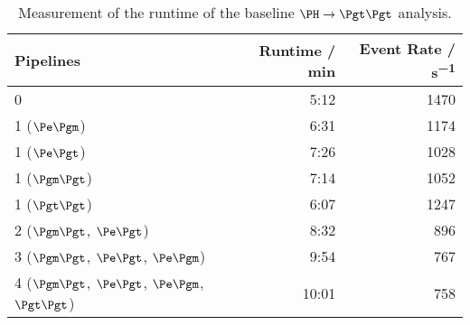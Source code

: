 \documentclass[3p]{elsarticle}
\begin{document}
\begin{table}[!ht]
\centering
\begin{tabular}{lrr}
\toprule
\textbf{Pipelines}                                & \textbf{Runtime / \si{min}} & \textbf{Event Rate / \si{s^{-1}} } \\ \midrule
 0                                                & 5:12                             & 1470 \\ \midrule
 1 ($\Pe\Pgm$)                                    & 6:31                             & 1174 \\
 1 ($\Pe\Pgt$)                                    & 7:26                             & 1028 \\
 1 ($\Pgm\Pgt$)                                   & 7:14                             & 1052 \\
 1 ($\Pgt\Pgt$)                                   & 6:07                             & 1247 \\ \midrule
 2 ($\Pgm\Pgt$, $\Pe\Pgt$)                        & 8:32                             & 896 \\
 3 ($\Pgm\Pgt$, $\Pe\Pgt$, $\Pe\Pgm$)             & 9:54                             & 767 \\
 4 ($\Pgm\Pgt$, $\Pe\Pgt$, $\Pe\Pgm$, $\Pgt\Pgt$) & 10:01                            & 758 \\
\bottomrule
\end{tabular}
\caption[Measurement of the runtime of the baseline $\PH\to\Pgt\Pgt$ analysis.]{Measurement of the runtime of the baseline $\PH\to\Pgt\Pgt$ analysis.
}
\end{table}
\end{document}
